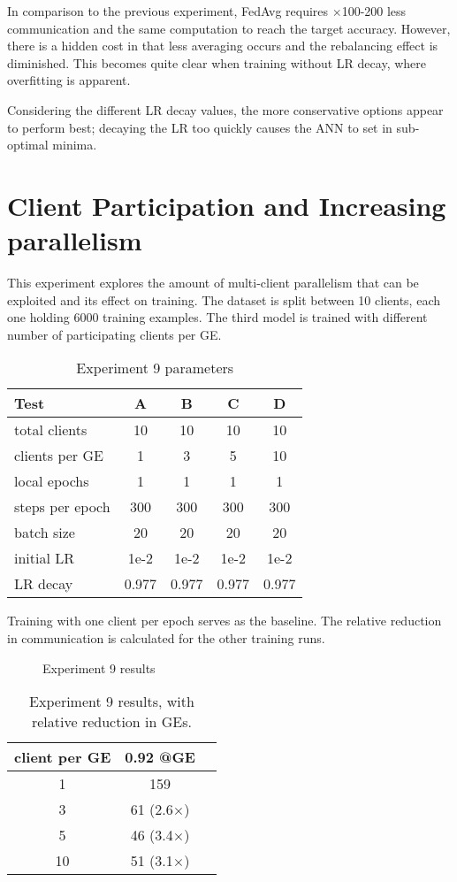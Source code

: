 In comparison to the previous experiment, FedAvg requires \(\times\)100-200 less communication and the same computation to reach the target accuracy. However, there is a hidden cost in that less averaging occurs and the rebalancing effect is diminished. This becomes quite clear when training without LR decay, where overfitting is apparent.

Considering the different LR decay values, the more conservative options appear to perform best; decaying the LR too quickly causes the ANN to set in sub-optimal minima.

\section{Client Participation and Increasing parallelism}
This experiment explores the amount of multi-client parallelism that can be exploited and its effect on training. The dataset is split between 10 clients, each one holding 6000 training examples. The third model is trained with different number of participating clients per GE.
\begin{table}[H]
    \center
    \begin{tabular}{ | l | c | c | c | c | }
        \hline
        Test & A & B & C & D\\\hline
        total clients   & 10 & 10 & 10 & 10\\\hline
        clients per GE  & 1 & 3 & 5 & 10\\\hline
        local epochs    & 1 & 1 & 1 & 1\\\hline
        steps per epoch & 300 & 300 & 300 & 300\\\hline
        batch size      & 20 & 20 & 20 & 20\\\hline
        initial LR      & 1e-2 & 1e-2 & 1e-2 & 1e-2\\\hline
        LR decay        & 0.977 & 0.977 & 0.977 & 0.977\\\hline
    \end{tabular}
    \caption[Experiment 9 parameters]{Experiment 9 parameters}
\end{table}
Training with one client per epoch serves as the baseline. The relative reduction in communication is calculated for the other training runs.
\begin{figure}[H]
    \center
    
    \caption[Experiment 9 results]{Experiment 9 results}
    \label{fig:Experiment 9 results}
\end{figure}
\begin{table}[H]
\center
    \begin{tabular}{ | c | c | c | }
        \hline
        client per GE & 0.92 @GE\\\hline
        1 & 159\\\hline
        3 & 61 (2.6$\times$)\\\hline
        5 & 46 (3.4$\times$)\\\hline
        10 & 51 (3.1$\times$)\\\hline
    \end{tabular}
    \caption[Experiment 9 results]{Experiment 9 results, with relative reduction in GEs.}
\end{table}
